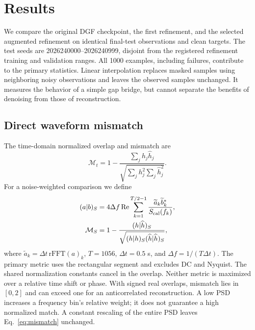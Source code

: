 \documentclass[10pt,prd,aps,a4paper,twocolumn,superscriptaddress,nofootinbib,floatfix]{revtex4-2}
\begin{document}
\section{Results}\label{sec:results}
We compare the original DGF checkpoint, the first refinement, and the selected augmented refinement on identical final-test observations and clean targets. The test seeds are 2026240000--2026240999, disjoint from the registered refinement training and validation ranges. All 1000 examples, including failures, contribute to the primary statistics. Linear interpolation replaces masked samples using neighboring noisy observations and leaves the observed samples unchanged. It measures the behavior of a simple gap bridge, but cannot separate the benefits of denoising from those of reconstruction.

\subsection{Direct waveform mismatch}\label{subsec:Mismatch}
The time-domain normalized overlap and mismatch are
\begin{equation}
\mathcal M_t=1-\frac{\sum_jh_j\widehat h_j}{\sqrt{\sum_jh_j^2\sum_j\widehat h_j^2}}.
\end{equation}
For a noise-weighted comparison we define
\begin{align}
(a|b)_S&=4\Delta f\operatorname{Re}\sum_{k=1}^{T/2-1}\frac{\widetilde a_k\widetilde b_k^*}{S_{\rm cal}(f_k)},\\
\mathcal M_S&=1-\frac{(h|\widehat h)_S}{\sqrt{(h|h)_S(\widehat h|\widehat h)_S}},\label{eq:mismatch}
\end{align}
where $\widetilde a_k=\Delta t\,\mathrm{rFFT}(a)_k$, $T=1056$, $\Delta t=0.5$ s, and $\Delta f=1/(T\Delta t)$. The primary metric uses the rectangular segment and excludes DC and Nyquist. The shared normalization constants cancel in the overlap. Neither metric is maximized over a relative time shift or phase. With signed real overlaps, mismatch lies in $[0,2]$ and can exceed one for an anticorrelated reconstruction. A low PSD increases a frequency bin's relative weight; it does not guarantee a high normalized match. A constant rescaling of the entire PSD leaves Eq.~\eqref{eq:mismatch} unchanged.
\end{document}
